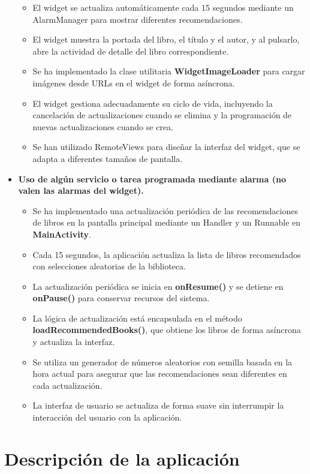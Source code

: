 \documentclass[a4paper,11pt]{report}
\begin{document}
\begin{itemize}
\begin{itemize}
            \item El widget se actualiza automáticamente cada 15 segundos mediante un AlarmManager para mostrar diferentes recomendaciones.
            \item El widget muestra la portada del libro, el título y el autor, y al pulsarlo, abre la actividad de detalle del libro correspondiente.
            \item Se ha implementado la clase utilitaria \textbf{WidgetImageLoader} para cargar imágenes desde URLs en el widget de forma asíncrona.
            \item El widget gestiona adecuadamente su ciclo de vida, incluyendo la cancelación de actualizaciones cuando se elimina y la programación de nuevas actualizaciones cuando se crea.
            \item Se han utilizado RemoteViews para diseñar la interfaz del widget, que se adapta a diferentes tamaños de pantalla.
          \end{itemize}
        \item \textbf{Uso de algún servicio o tarea programada mediante alarma (no valen las alarmas del widget).}
          \begin{itemize}
            \item Se ha implementado una actualización periódica de las recomendaciones de libros en la pantalla principal mediante un Handler y un Runnable en \textbf{MainActivity}.
            \item Cada 15 segundos, la aplicación actualiza la lista de libros recomendados con selecciones aleatorias de la biblioteca.
            \item La actualización periódica se inicia en \textbf{onResume()} y se detiene en \textbf{onPause()} para conservar recursos del sistema.
            \item La lógica de actualización está encapsulada en el método \textbf{loadRecommendedBooks()}, que obtiene los libros de forma asíncrona y actualiza la interfaz.
            \item Se utiliza un generador de números aleatorios con semilla basada en la hora actual para asegurar que las recomendaciones sean diferentes en cada actualización.
            \item La interfaz de usuario se actualiza de forma suave sin interrumpir la interacción del usuario con la aplicación.
          \end{itemize}
      \end{itemize}
  \chapter{Descripción de la aplicación}
\end{document}

